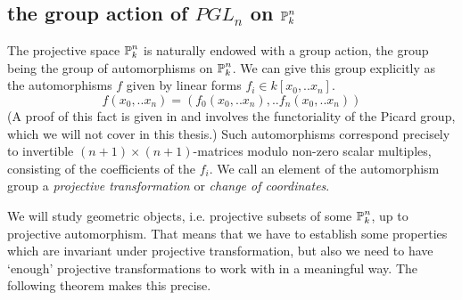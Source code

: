 \subsection{the group action of $PGL_n$ on $\operatorname{\mathbb P}^n_k$}

The projective space $\operatorname{\mathbb P}^n_k$ is naturally endowed with a group action, the group being the group of automorphisms on $\operatorname{\mathbb P}^n_k$.
We can give this group explicitly as the automorphisms $f$ given by linear forms $f_i \in k[x_0,..x_n]$.
\begin{equation}
f(x_0,..x_n) = (f_0(x_0,..x_n),..f_n(x_0,..x_n))
\end{equation}
(A proof of this fact is given in \cite[example 7.1.1]{hartshorne1977algebraic} and involves the functoriality of the Picard group, which we will not cover in this thesis.)
Such automorphisms correspond precisely to invertible $(n+1)\times(n+1)$-matrices modulo non-zero scalar multiples, consisting of the coefficients of the $f_i$.
We call an element of the automorphism group a \emph{projective transformation} or \emph{change of coordinates}.

We will study geometric objects, i.e. projective subsets of some $\operatorname{\mathbb P}^n_k$, up to projective automorphism.
That means that we have to establish some properties which are invariant under projective transformation, but also we need to have `enough' projective transformations to work with in a meaningful way.
The following theorem makes this precise.

